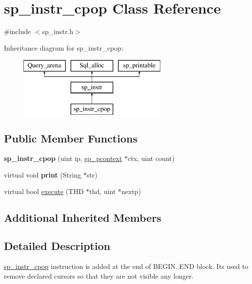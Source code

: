 \hypertarget{classsp__instr__cpop}{}\section{sp\+\_\+instr\+\_\+cpop Class Reference}
\label{classsp__instr__cpop}


{\ttfamily \#include $<$sp\+\_\+instr.\+h$>$}

Inheritance diagram for sp\+\_\+instr\+\_\+cpop\+:\begin{figure}[H]
\begin{center}
\leavevmode
\includegraphics[height=3.000000cm]{classsp__instr__cpop}
\end{center}
\end{figure}
\subsection*{Public Member Functions}
\begin{DoxyCompactItemize}
\item 
\mbox{\label{classsp__instr__cpop_abe7e5ffeabf5ced307b7f1f53e1c35f0}} 
{\bfseries sp\+\_\+instr\+\_\+cpop} (uint ip, \mbox{\hyperlink{classsp__pcontext}{sp\+\_\+pcontext}} $\ast$ctx, uint count)
\item 
\mbox{\label{classsp__instr__cpop_a7b31635ab4229360662726f2f181b533}} 
virtual void {\bfseries print} (String $\ast$str)
\item 
virtual bool \mbox{\hyperlink{classsp__instr__cpop_ab995e94b2fe0a9b9cfac848ba2d04df9}{execute}} (T\+HD $\ast$thd, uint $\ast$nextp)
\end{DoxyCompactItemize}
\subsection*{Additional Inherited Members}


\subsection{Detailed Description}
\mbox{\hyperlink{classsp__instr__cpop}{sp\+\_\+instr\+\_\+cpop}} instruction is added at the end of B\+E\+G\+IN..E\+ND block. It\textquotesingle{}s used to remove declared cursors so that they are not visible any longer. 

